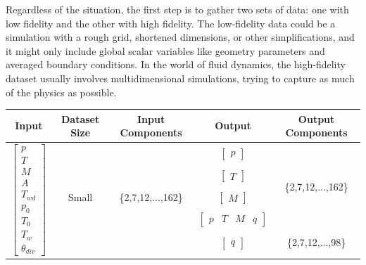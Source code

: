 Regardless of the situation, the first step is to gather two sets of data: one with low fidelity and the other with high fidelity. The low-fidelity data could be a simulation with a rough grid, shortened dimensions, or other simplifications, and it might only include global scalar variables like geometry parameters and averaged boundary conditions. In the world of fluid dynamics, the high-fidelity dataset usually involves multidimensional simulations, trying to capture as much of the physics as possible.

\begin{table}[h!]
    \centering
    \begin{tabular}{c c c c c} 
     \hline
     \textbf{Input} & \textbf{Dataset Size}  &\textbf{Input Components} &  \textbf{Output}  & \textbf{Output Components}\\ 
     \hline
     \hline
     \multirow{15}{*}{$\begin{bmatrix} p \\ T \\ M \\ A \\ T_{wd} \\ p_0 \\ T_0 \\ T_w \\ \theta_{div} \end{bmatrix}^{}$ } & \multirow{5}{*}{Small}  & \multirow{5}{*}{\{2,7,12,...,162\}} & $\begin{bmatrix} p \end{bmatrix}$    & \multirow{4}{*}{\{2,7,12,...,162\}} \\ 
                            & &                                     & $\begin{bmatrix} T \end{bmatrix}$ & \\ 
                            & &                                     & $\begin{bmatrix} M \end{bmatrix}$        & \\ 
                            & &                                     & $\begin{bmatrix} p & T & M & q \end{bmatrix}$  & \\ \cline{4-5}
                            & &                                     & $\begin{bmatrix} q \end{bmatrix}$   & \{2,7,12,...,98\} \\ \cline{2-5}
                        

\end{tabular}
\end{table}
